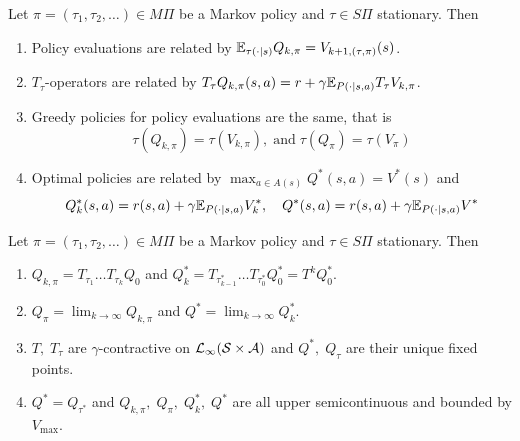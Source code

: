 \begin{prop}
  Let $\pi = (\tau_1, \tau_2, \dots) \in M\Pi$ be a Markov policy
  and $\tau \in S\Pi$ stationary. Then
  \leavevmode
  \begin{enumerate}
    \item Policy evaluations are related by
      $\mathbb{E}_{\tau(\cdot \mid s)} Q_{k, \pi} = V_{k+1, (\tau, \pi)}(s)$.
    \item $T_\tau$-operators are related by $T_\tau Q_{k, \pi}(s, a)
      = r + \gamma \mathbb{E}_{P(\cdot \mid s, a)} T_\tau V_{k, \pi}$.
    \item Greedy policies for policy evaluations are the same,
      that is
      \[ \tau(Q_{k, \pi}) = \tau(V_{k, \pi}), \; \mathrm{and} \;
      \tau(Q_\pi) = \tau(V_\pi) \]
    \item Optimal policies are related by
      $\max_{a \in A(s)} Q^*(s, a) = V^*(s)$ and
      \[ Q^*_k(s, a) = r(s, a) + \gamma \mathbb{E}_{P(\cdot \mid s, a)} V^*_k,
      \quad Q^*(s, a) = r(s, a) + \gamma \mathbb{E}_{P(\cdot \mid s, a)} V^* \]
    \end{enumerate}
  \label{prop:relQV}
\end{prop}

\begin{prop}
  Let $\pi = (\tau_1, \tau_2, \dots) \in M\Pi$ be a Markov policy
  and $\tau \in S\Pi$ stationary. Then
  \leavevmode
  \begin{enumerate}
    \item $Q_{k, \pi} = T_{\tau_1} \dots T_{\tau_k} Q_0$ and
      $Q^*_k = T_{\tau_{k-1}^*} \dots T_{\tau_0^*} Q^*_0
      = T^k Q^*_0$.
    \item $Q_\pi = \lim_{k \to \infty} Q_{k, \pi}$ and
      $Q^* = \lim_{k\to\infty} Q_k^*$. 
    \item $T,\; T_\tau$ are $\gamma$-contractive on
      $\mathcal{L}_\infty(\mathcal{S}\times\mathcal{A})$
      and $Q^*,\; Q_\tau$ are their unique fixed points.
    \item $Q^* = Q_{\tau^*}$ and
      $Q_{k, \pi},\; Q_\pi,\; Q^*_k,\; Q^*$ are all upper semicontinuous
      and bounded by $V_{\max}$.
  \end{enumerate}
  \label{prop:propQ}
\end{prop}


